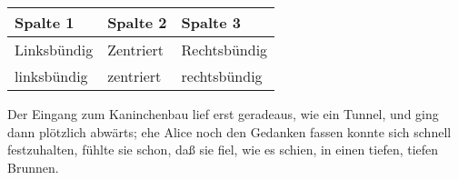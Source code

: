 \begin{center}
\begin{tabular}{lll}
  \toprule
   Spalte 1 &  Spalte 2 & Spalte 3\\
   \midrule
   Linksbündig & Zentriert & Rechtsbündig\\
   linksbündig & zentriert & rechtsbündig\\
   \bottomrule
\end{tabular}
\end{center}

Der Eingang zum Kaninchenbau lief erst geradeaus, wie ein Tunnel, und ging dann
plötzlich abwärts; ehe Alice noch den Gedanken fassen konnte sich schnell
festzuhalten, fühlte sie schon, daß sie fiel, wie es schien, in einen tiefen,
tiefen Brunnen.


\clearpage

